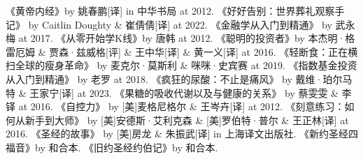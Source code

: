 \documentclass[12pt,oneside]{book}
\begin{document}
\begin{thebibliography}{99}
 《黄帝内经》by 姚春鹏[译] in 中华书局 at 2012.
 《好好告别：世界葬礼观察手记》 by Caitlin Doughty \& 崔倩倩[译] at 2022. 
 《金融学从入门到精通》 by 武永梅 at 2017.
 《从零开始学K线》by 唐韩 at 2012. 
 《聪明的投资者》by 本杰明·格雷厄姆 \& 贾森·兹威格[评] \& 王中华[译] \& 黄一义[译] at 2016.
  《轻断食：正在横扫全球的瘦身革命》 by 麦克尔·莫斯利 \& 咪咪·史宾赛 at 2019.
  《指数基金投资从入门到精通》 by 老罗 at 2018.
  《疯狂的尿酸：不止是痛风》 by 戴维·珀尔马特 \& 王家宁[译] at 2023.
  《果糖的吸收代谢以及与健康的关系》 by 蔡雯雯 \& 李铎 at 2016.
  《自控力》 by [美]麦格尼格尔  \& 王岑卉[译] at 2012.
 《刻意练习：如何从新手到大师》 by [美]安德斯·艾利克森 \& [美]罗伯特·普尔 \& 王正林[译] at 2016.
 《圣经的故事》 by [美]房龙 \& 朱振武[译] in 上海译文出版社.
 《新约圣经四福音》by 和合本.
 《旧约圣经约伯记》by 和合本.
\end{thebibliography}
\end{document}
